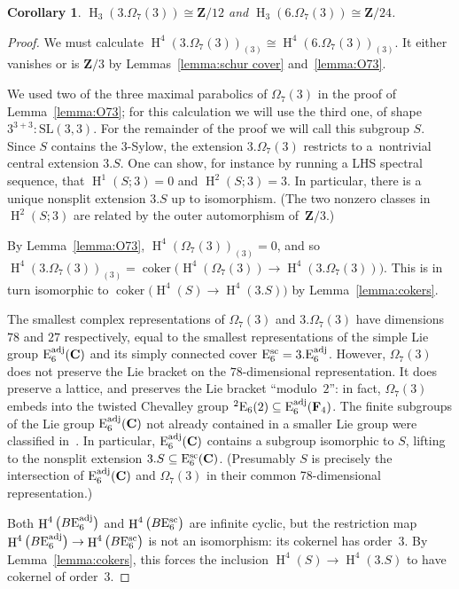\documentclass[pdftex]{sigma}
\numberwithin{equation}{section}
\newtheorem{Corollary}[Theorem]{Corollary}
\newcommand\bC{\mathbf C}
\newcommand\bF{\mathbf F}
\newcommand\bZ{\mathbf Z}
\newcommand\rE{\mathrm E}
\DeclareMathOperator\homology{H}
\renewcommand\H{\homology}
\newcommand\<\langle
\renewcommand\>\rangle
\DeclareMathOperator\coker{coker}
\newcommand{\SL}{\mathrm{SL}}
\begin{document}
\begin{Corollary} \label{cor:3o73}
 $\H_3(3.\Omega_7(3)) \cong \bZ/12$ and $\H_3(6.\Omega_7(3)) \cong \bZ/24$.
\end{Corollary}
\begin{proof} We must calculate $\H^4(3.\Omega_7(3))_{(3)} \cong \H^4(6.\Omega_7(3))_{(3)}$. It either vanishes or is $\bZ/3$ by Lemmas~\ref{lemma:schur cover} and~\ref{lemma:O73}.

 We used two of the three maximal parabolics of $\Omega_7(3)$ in the proof of Lemma~\ref{lemma:O73}; for this calculation we will use the third one, of shape $3^{3+3}:\SL(3,3)$.
 For the remainder of the proof we will call this subgroup $S$. Since $S$ contains the $3$-Sylow, the extension $3.\Omega_7(3)$ restricts to a~nontrivial central extension $3.S$.
 One can show, for instance by running a LHS spectral sequence, that $\H^1(S;3) = 0$ and $\H^2(S;3) = 3$. In particular, there is a unique nonsplit extension $3.S$
 up to isomorphism. (The two nonzero classes in $\H^2(S;3)$ are related by the outer automorphism of~$\bZ/3$.)

 By Lemma~\ref{lemma:O73}, $\H^4(\Omega_7(3))_{(3)} = 0$, and so $\H^4(3.\Omega_7(3))_{(3)} = \coker\big(\H^4(\Omega_7(3)) \to \H^4(3.\Omega_7(3))\big)$. This is in turn isomorphic to $\coker\big(\H^4(S) \to \H^4(3.S)\big)$ by Lemma~\ref{lemma:cokers}.

 The smallest complex representations of $\Omega_7(3)$ and $3.\Omega_7(3)$ have dimensions $78$ and $27$ respectively, equal to the smallest representations of the simple Lie group $\rE_6^{\rm adj}(\bC)$ and its simply connected cover $\rE_6^{\rm sc} = 3.\rE_6^{\rm adj}$. However, $\Omega_7(3)$ does not preserve the Lie bracket on the $78$-dimensional representation. It does preserve a lattice, and preserves the Lie bracket ``modulo~$2$'': in fact, $\Omega_7(3)$ embeds into the twisted Chevalley group $^2\rE_6(2) \subseteq \rE_6^{\rm adj}(\bF_4)$. The finite subgroups of the Lie group $\rE_6^{\rm adj}(\bC)$ {not already contained in a smaller Lie group} were classified in~\cite{MR1416728}.
 {In particular, $\rE_6^{\rm adj}(\bC)$ contains a subgroup isomorphic to $S$, lifting to the nonsplit extension $3.S \subseteq \rE_6^{\rm sc}(\bC)$. (Presumably $S$ is precisely the intersection of $\rE_6^{\rm adj}(\bC)$ and $\Omega_7(3)$ in their common 78-dimensional representation.)}

 Both $\H^4\big(B\rE_6^{\rm adj}\big)$ and $\H^4\big(B\rE_6^{\rm sc}\big)$ are infinite cyclic, but the restriction map $\H^4\big(B\rE_6^{\rm adj}\big) \to \H^4\big(B\rE_6^{\rm sc}\big)$ is not an isomorphism: its cokernel has order~$3$. By Lemma~\ref{lemma:cokers}, this forces the inclusion $\H^4(S) \to \H^4(3.S)$ to have cokernel of order~$3$.
\end{proof}
\end{document}
